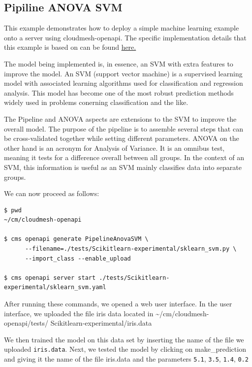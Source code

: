 \subsection{Pipiline ANOVA SVM}\label{a.2.-pipiline-anova-svm}

This example demonstrates how to deploy a simple machine learning
example onto a server using cloudmesh-openapi. The specific
implementation details that this example is based on can be found
\href{https://scikit-learn.org/stable/auto_examples/feature_selection/plot_feature_selection_pipeline.html}{here.}

The model being implemented is, in essence, an SVM with extra features
to improve the model. An SVM (support vector machine) is a supervised
learning model with associated learning algorithms used for
classification and regression analysis. This model has become one of the
most robust prediction methods widely used in problems conerning
classification and the like.

The Pipeline and ANOVA aspects are extensions to the SVM to improve the
overall model. The purpose of the pipeline is to assemble several steps
that can be cross-validated together while setting different parameters.
ANOVA on the other hand is an acronym for Analysis of Variance. It is an
omnibus test, meaning it tests for a difference overall between all
groups. In the context of an SVM, this information is useful as an SVM
mainly classifies data into separate groups.

We can now proceed as follows:

\begin{verbatim}
$ pwd
~/cm/cloudmesh-openapi

$ cms openapi generate PipelineAnovaSVM \
      --filename=./tests/Scikitlearn-experimental/sklearn_svm.py \
      --import_class --enable_upload

$ cms openapi server start ./tests/Scikitlearn-experimental/sklearn_svm.yaml
\end{verbatim}

After running these commands, we opened a web user interface. In the
user interface, we uploaded the file iris data located in
\textasciitilde/cm/cloudmesh-openapi/tests/
Scikitlearn-experimental/iris.data

We then trained the model on this data set by inserting the name of the
file we uploaded \texttt{iris.data}. Next, we tested the model by
clicking on make\_prediction and giving it the name of the file
iris.data and the parameters \texttt{5.1}, \texttt{3.5}, \texttt{1.4},
\texttt{0.2}

